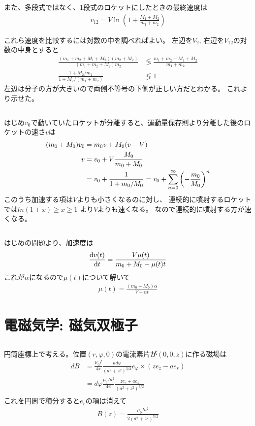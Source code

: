 \documentclass[../../master.tex]{subfiles}
\begin{document}
また、多段式ではなく、1段式のロケットにしたときの最終速度は
\begin{align}
    v_{12} = V\ln(1+\frac{M_1+M_2}{m_1+m_2})
\end{align}

これら速度を比較するには対数の中を調べればよい。
左辺を\(V_2\), 右辺を\(V_{12}\)の対数の中身とすると
\begin{align}
    \frac{(m_1+m_2+M_1+M_2)(m_2+M_2)}{(m_1+m_2+M_2)m_2}&\lessgtr\frac{m_1+m_2+M_1+M_2}{m_1+m_2}\\
    \frac{1+M_2/m_1}{1+M_2/(m_1+m_2)}& \lessgtr 1
\end{align}
左辺は分子の方が大きいので両側不等号の下側が正しい方だとわかる。
これより示せた。

\section{}
はじめ\(v_0\)で動いていたロケットが分離すると、運動量保存則より分離した後のロケットの速さ\(v\)は
\begin{align}
    (m_0+M_0)v_0 &= m_0 v + M_0(v-V)\\
    v &= v_0 +V\frac{M_0}{m_0 + M_0} \\
    &= v_0 + \frac{1}{1+m_0/M_0} = v_0 + \sum_{n=0}^{\infty}\qty(-\frac{m_0}{M_0})^n
\end{align}
このうち加速する項は\(V\)よりも小さくなるのに対し、
連続的に噴射するロケットでは\(ln(1+x)\geq x \geq 1\) より\(V\)よりも速くなる。
なので連続的に噴射する方が速くなる。

\section{}
はじめの問題より、加速度は
\begin{align}
    \dv{v(t)}{t} = \frac{V\mu(t)}{m_0+M_0-\mu(t)t}
\end{align}
これが\(\alpha\)になるので\(\mu(t)\)について解いて
\begin{align}
    \mu(t) = \frac{(m_0+M_0)\alpha}{V+\alpha t}
\end{align}

\chapter{電磁気学: 磁気双極子}
\section{}
円筒座標上で考える。位置\((r,\varphi,0)\)の電流素片が\((0,0,z)\)に作る磁場は
\begin{align}
    dB &= \frac{\mu_0I}{4\pi}\frac{ad\varphi}{(a^2+z^2)^{3/2}} e_{\varphi}\times(ze_z-ae_r)\\
       &= d\varphi\frac{\mu_0Ia^2}{4\pi}\frac{ze_r+ae_z}{(a^2+z^2)^{3/2}} \\
\end{align}
これを円周で積分すると\(e_r\)の項は消えて
\begin{align}
    B(z) = \frac{\mu_0Ia^2}{2(a^2+z^2)^{3/2}}
\end{align}
\end{document}
